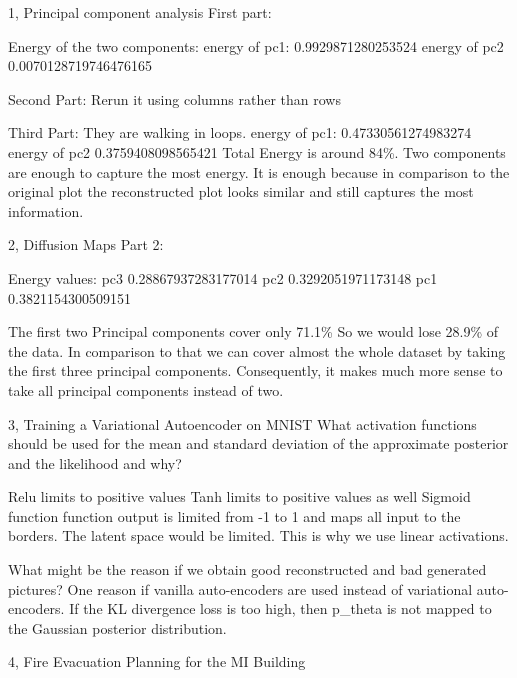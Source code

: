 \documentclass[10pt,a4paper]{article}
\begin{document}
\frontpage

\begin{task}{1, Principal component analysis}
First part: 

Energy of the two components: 
energy of pc1: 0.9929871280253524 energy of pc2 0.0070128719746476165 

Second Part: 
Rerun it using columns rather than rows 

Third Part: 
They are walking in loops. 
energy of pc1: 0.47330561274983274 energy of pc2 0.3759408098565421 
Total Energy is around 84\%. Two components are enough to capture the most energy. 
It is enough because in comparison to the original plot the reconstructed plot looks similar and still captures the most information. 
\end{task}
\begin{task}{2, Diffusion Maps}
Part 2: 

Energy values:  
pc3 0.28867937283177014  
pc2 0.3292051971173148  
pc1 0.3821154300509151 

The first two Principal components cover only 71.1\% So we would lose 28.9\% of the data.
In comparison to that we can cover almost the whole dataset by taking the first three principal components. Consequently, it makes much more sense to take all principal components instead of two. 
\end{task}
\begin{task}{3, Training a Variational Autoencoder on MNIST}
What activation functions should be used for the mean and standard deviation of the approximate posterior and the likelihood and why? 

Relu limits to positive values 
Tanh limits to positive values as well 
Sigmoid function function output is limited from -1 to 1 and maps all input to the borders. The latent space would be limited. 
This is why we use linear activations. 

What might be the reason if we obtain good reconstructed and bad generated pictures? 
One reason if vanilla auto-encoders are used instead of variational auto-encoders. 
If the KL divergence loss is too high, then p\_theta is not mapped to the Gaussian posterior distribution.
\end{task}
\begin{task}{4, Fire Evacuation Planning for the MI Building}
\end{task}
\end{document}
